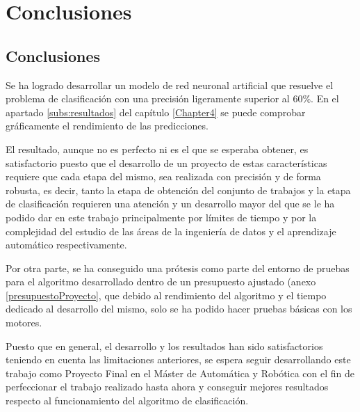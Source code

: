 \chapter{Conclusiones} %
\label{Chapter5}





%
%
%
%

\section{Conclusiones}
\label{sec:conclusiones}

Se ha logrado desarrollar un modelo de red neuronal artificial que resuelve el problema de clasificación con una precisión ligeramente superior al 60\%. En el apartado \ref{subs:resultados} del capítulo \ref{Chapter4} se puede comprobar gráficamente el rendimiento de las predicciones.

El resultado, aunque no es perfecto ni es el que se esperaba obtener, es satisfactorio puesto que el desarrollo de 
un proyecto de estas características requiere que cada etapa del mismo, sea realizada con precisión y de forma 
robusta, es decir, tanto la etapa de obtención del conjunto de trabajos y la etapa de clasificación requieren una 
atención y un desarrollo mayor del que se le ha podido dar en este trabajo principalmente por límites de tiempo y 
por la complejidad del estudio de las áreas de la ingeniería de datos y el aprendizaje automático respectivamente.

Por otra parte, se ha conseguido una prótesis como parte del entorno de pruebas para el algoritmo desarrollado 
dentro de un presupuesto ajustado (anexo \ref{presupuestoProyecto}, que debido al rendimiento del algoritmo y el 
tiempo dedicado al desarrollo del mismo, solo se ha podido hacer pruebas básicas con los motores.

Puesto que en general, el desarrollo y los resultados han sido satisfactorios teniendo en cuenta las limitaciones 
anteriores, se espera seguir desarrollando este trabajo como Proyecto Final en el Máster de Automática y Robótica 
con el fin de perfeccionar el trabajo realizado hasta ahora y conseguir mejores resultados respecto al 
funcionamiento del algoritmo de clasificación.


